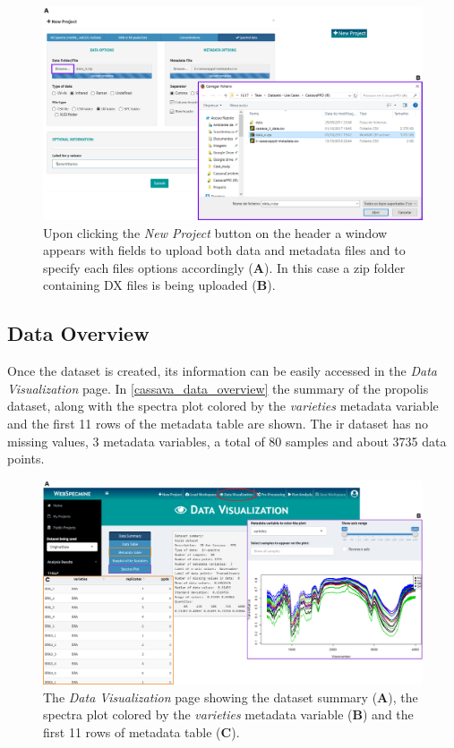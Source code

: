 \begin{figure}[h]
	\centering
	\includegraphics[width=1\linewidth]{Imagens/CassavaPPD/data_load}
	\caption{Upon clicking the \textit{New Project} button on the header a window appears with fields to upload both data and metadata files and to specify each files options accordingly (\textbf{A}). In this case a zip folder containing DX files is being uploaded (\textbf{B}).}
	\label{cassava_create_project}
\end{figure}


\subsection{Data Overview}

Once the dataset is created, its information can be easily accessed in the \textit{Data Visualization} page. In \autoref{cassava_data_overview} the summary of the propolis dataset, along with the spectra plot colored by the \textit{varieties} metadata variable and the first 11 rows of the metadata table are shown. The \gls{ir} dataset has no missing values, 3 metadata variables, a total of 80 samples and about 3735 data points.

\begin{figure}[h]
	\centering
	\includegraphics[width=1\linewidth]{Imagens/CassavaPPD/data_overview}
	\caption{The \textit{Data Visualization} page showing the dataset summary (\textbf{A}), the spectra plot colored by the \textit{varieties} metadata variable (\textbf{B}) and the first 11 rows of metadata table (\textbf{C}).}
	\label{cassava_data_overview}
\end{figure}


